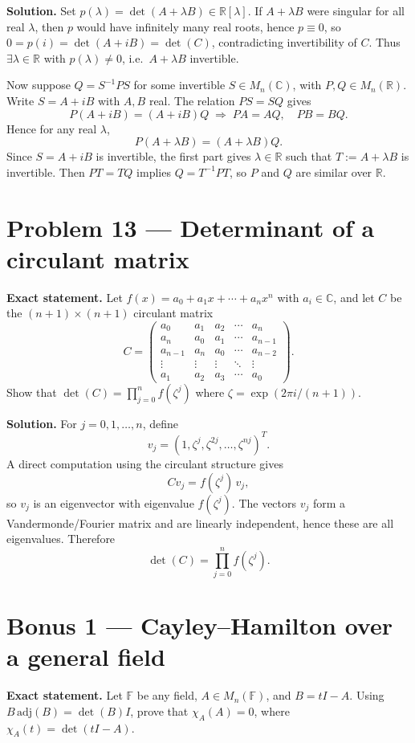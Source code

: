 \documentclass[12pt,a4paper]{article}
\theoremstyle{plain}
\theoremstyle{definition}      %
\begin{document}
\textbf{Solution.}
Set $p(\lambda)=\det(A+\lambda B)\in\mathbb R[\lambda]$. If $A+\lambda B$ were singular for all real $\lambda$, then $p$ would have infinitely many real roots, hence $p\equiv 0$, so $0=p(i)=\det(A+iB)=\det(C)$, contradicting invertibility of $C$.
Thus $\exists \lambda\in\mathbb R$ with $p(\lambda)\neq 0$, i.e.\ $A+\lambda B$ invertible.

Now suppose $Q=S^{-1}PS$ for some invertible $S\in M_n(\mathbb C)$, with $P,Q\in M_n(\mathbb R)$.
Write $S=A+iB$ with $A,B$ real. The relation $PS=SQ$ gives
\[
P(A+iB)=(A+iB)Q \;\Rightarrow\; PA=AQ,\quad PB=BQ.
\]
Hence for any real $\lambda$,
\[
P(A+\lambda B)=(A+\lambda B)Q.
\]
Since $S=A+iB$ is invertible, the first part gives $\lambda\in\mathbb R$ such that $T:=A+\lambda B$ is invertible.
Then $PT=TQ$ implies $Q=T^{-1}PT$, so $P$ and $Q$ are similar over $\mathbb R$.

\section*{Problem 13 — Determinant of a circulant matrix}

\textbf{Exact statement.}
Let $f(x)=a_0+a_1x+\cdots +a_n x^n$ with $a_i\in\mathbb C$, and let $C$ be the $(n+1)\times(n+1)$ circulant matrix
\[
C=\begin{pmatrix}
	a_0&a_1&a_2&\cdots&a_n\\
	a_n&a_0&a_1&\cdots&a_{n-1}\\
	a_{n-1}&a_n&a_0&\cdots&a_{n-2}\\
	\vdots&\vdots&\vdots&\ddots&\vdots\\
	a_1&a_2&a_3&\cdots&a_0
\end{pmatrix}.
\]
Show that $\det(C)=\prod_{j=0}^{n} f(\zeta^j)$ where $\zeta=\exp(2\pi i/(n+1))$.

\textbf{Solution.}
For $j=0,1,\dots,n$, define
\[
v_j=(1,\zeta^j,\zeta^{2j},\dots,\zeta^{nj})^T.
\]
A direct computation using the circulant structure gives
\[
Cv_j=f(\zeta^j)\,v_j,
\]
so $v_j$ is an eigenvector with eigenvalue $f(\zeta^j)$.
The vectors $v_j$ form a Vandermonde/Fourier matrix and are linearly independent, hence these are all eigenvalues.
Therefore
\[
\det(C)=\prod_{j=0}^{n} f(\zeta^j).
\]

\section*{Bonus 1 — Cayley--Hamilton over a general field}

\textbf{Exact statement.}
Let $\mathbb F$ be any field, $A\in M_n(\mathbb F)$, and $B=tI-A$.
Using $B\,\mathrm{adj}(B)=\det(B)I$, prove that $\chi_A(A)=0$, where $\chi_A(t)=\det(tI-A)$.
\end{document}
